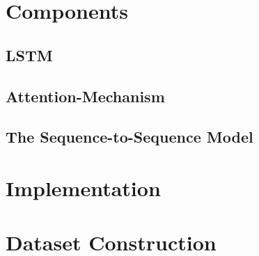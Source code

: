 \section{Components}

\subsection{LSTM}

\subsection{Attention-Mechanism}

\subsection{The Sequence-to-Sequence Model}

\section{Implementation}

\section{Dataset Construction}
